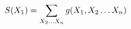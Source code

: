 \documentclass[preview]{standalone}
\begin{document}
\begin{align*}
\special{dvisvgm:raw <g id='unique000'>}S(X_1) = \sum_{X_2\ldots X_n} g(X_1, X_2\ldots X_n)\special{dvisvgm:raw </g>}
\end{align*}
\end{document}
